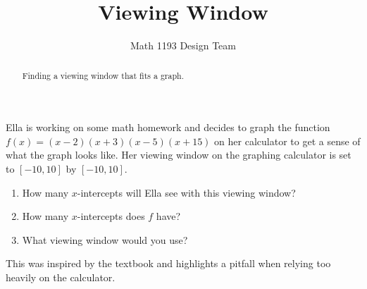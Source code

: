 \documentclass[noauthor]{ximera}
\title{Viewing Window}
\author{Math 1193 Design Team}
\begin{document}
\begin{abstract}
    Finding a viewing window that fits a graph.
\end{abstract}
\maketitle

Ella is working on some math homework and decides to graph the 
function 
\(f\left(x\right)=\left(x-2\right)\left(x+3\right)\left(x-5\right)\left(x+15\right)\) 
on her calculator to get a sense of what the graph looks like. Her 
viewing window on the graphing calculator is set to \([-10,10]\) by \([-10,10]\). 

\begin{enumerate}
    \item How many \(x\)-intercepts will Ella see with this viewing window?
    \item How many \(x\)-intercepts does \(f\) have?
    \item What viewing window would you use?
\end{enumerate}

\begin{instructorNotes}
This was inspired by the textbook and highlights a pitfall when relying 
too heavily on the calculator. 
\end{instructorNotes}
\end{document}
